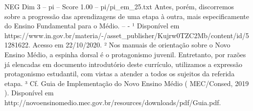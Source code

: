 \begin{textsample}{NEG Dim 3 – pi – Score 1.00 – pi/pi\_em\_25.txt}
Antes, porém, discorremos sobre a progressão das aprendizagens de uma etapa à outra, mais especificamente do Ensino Fundamental para o Médio. -- - ¹ Disponível em https://www.in.gov.br/materia/-/asset\_publisher/Kujrw0TZC2Mb/content/id/51281622.
Acesso em 22/10/2020. ² Nos manuais de orientação sobre o Novo Ensino Médio, a espinha dorsal é o protagonismo juvenil.
Entretanto, por razões já elencadas em documento introdutório deste currículo, utilizamos a expressão protagonismo estudantil, com vistas a atender a todos os sujeitos da referida etapa. ³ Cf.
Guia de Implementação do Novo Ensino Médio ( MEC/Consed, 2019 ).
Disponível em http://novoensinomedio.mec.gov.br/resources/downloads/pdf/Guia.pdf.

\end{textsample}
